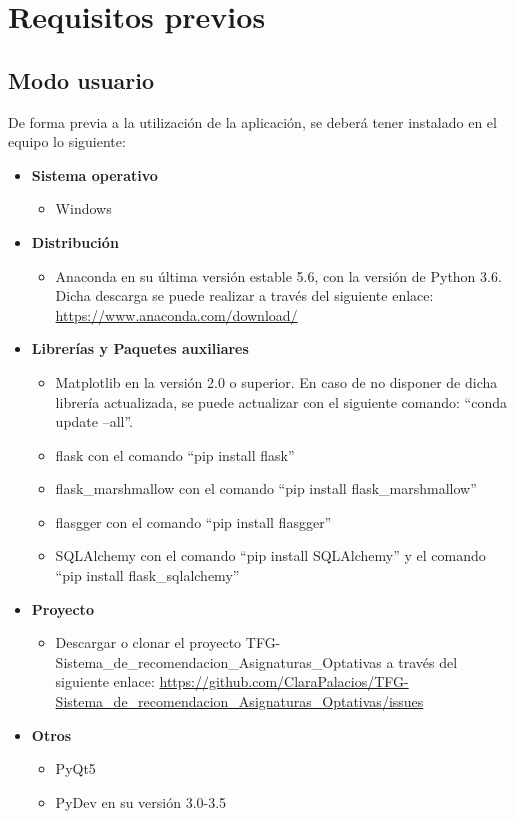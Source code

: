
\section{Requisitos previos}
\subsection{Modo usuario}
De forma previa a la utilización de la aplicación, se deberá tener instalado en el equipo lo siguiente: 
\begin{itemize}
\item \textbf{Sistema operativo}
\begin{itemize}
\item Windows
\end{itemize} 
\item \textbf{Distribución}
\begin{itemize}
\item Anaconda en su última versión estable 5.6, con la versión de Python 3.6. Dicha descarga se puede realizar a través del siguiente enlace: \url{https://www.anaconda.com/download/}
\end{itemize}
\item \textbf{Librerías  y Paquetes auxiliares}
\begin{itemize}
\item Matplotlib en la versión 2.0 o superior. En caso de no disponer de dicha librería actualizada, se puede actualizar con el siguiente comando: ``conda update --all''.
\item flask con el comando ``pip install flask''
\item flask\_marshmallow con el comando ``pip install flask\_marshmallow''
\item flasgger con el comando ``pip install flasgger''
\item SQLAlchemy con el comando ``pip install SQLAlchemy'' y el comando ``pip install flask\_sqlalchemy''
\end{itemize}
\item \textbf{Proyecto}
\begin{itemize}
\item Descargar o clonar el proyecto TFG-Sistema\_de\_recomendacion\_Asignaturas\_Optativas a través del siguiente enlace: \url{https://github.com/ClaraPalacios/TFG-Sistema_de_recomendacion_Asignaturas_Optativas/issues}
\end{itemize}
\item \textbf{Otros}
\begin{itemize}
\item PyQt5
\item PyDev en su versión 3.0-3.5
\end{itemize}
\end{itemize}

